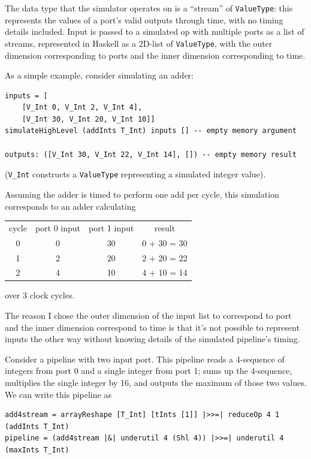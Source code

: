 \documentclass[12pt]{article}
\begin{document}
The data type that the simulator operates on is a ``stream'' of
\texttt{ValueType}: this represents the values of a port's valid
outputs through time, with no timing details included. Input is passed
to a simulated op with multiple ports as a list of streams,
represented in Haskell as a 2D-list of \texttt{ValueType}, with the
outer dimension corresponding to ports and the inner dimension
corresponding to time.

As a simple example, consider simulating an adder:

\begin{verbatim}
inputs = [
    [V_Int 0, V_Int 2, V_Int 4],
    [V_Int 30, V_Int 20, V_Int 10]]
simulateHighLevel (addInts T_Int) inputs [] -- empty memory argument

outputs: ([V_Int 30, V_Int 22, V_Int 14], []) -- empty memory result
\end{verbatim}

(\texttt{V\_Int} constructs a \texttt{ValueType} representing a
simulated integer value).

Assuming the adder is timed to perform one add per cycle, this simulation
corresponds to an adder calculating
\begin{center}
\begin{tabular}{c|c c|c}
cycle & port 0 input & port 1 input & result\\
0 & 0 & 30 & 0 + 30 = 30 \\
1 & 2 & 20 & 2 + 20 = 22 \\
2 & 4 & 10 & 4 + 10 = 14
\end{tabular}
\end{center}
over 3 clock cycles.

The reason I chose the outer dimension of the input list to correspond to
port and the inner dimension correspond to time is that it's not possible
to represent inputs the other way without knowing details of the simulated
pipeline's timing.

Consider a pipeline with two input port. This pipeline reads a 4-sequence
of integers from port 0 and a single integer from port 1; sums up the
4-sequence, multiplies the single integer by 16, and outputs the
maximum of those two values. We can write this pipeline as

\begin{verbatim}
add4stream = arrayReshape [T_Int] [tInts [1]] |>>=| reduceOp 4 1 (addInts T_Int)
pipeline = (add4stream |&| underutil 4 (Shl 4)) |>>=| underutil 4 (maxInts T_Int)
\end{verbatim}
\end{document}
